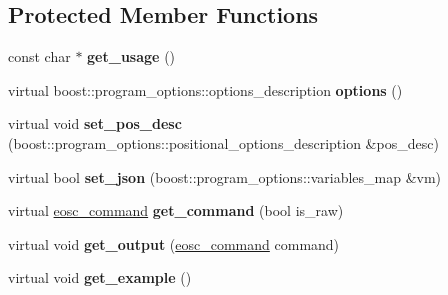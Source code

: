 \subsection*{Protected Member Functions}
\begin{DoxyCompactItemize}
\item 
\mbox{\label{classtokenika_1_1eosc_1_1get__block__options_a4bbbc3a59f550c1b82abe56be743d922}} 
const char $\ast$ {\bfseries get\+\_\+usage} ()
\item 
\mbox{\label{classtokenika_1_1eosc_1_1get__block__options_ad0734aa9d509a4b3465b6bc4e3bbbf69}} 
virtual boost\+::program\+\_\+options\+::options\+\_\+description {\bfseries options} ()
\item 
\mbox{\label{classtokenika_1_1eosc_1_1get__block__options_ac1d672107af6d977f72b3a8c24792859}} 
virtual void {\bfseries set\+\_\+pos\+\_\+desc} (boost\+::program\+\_\+options\+::positional\+\_\+options\+\_\+description \&pos\+\_\+desc)
\item 
\mbox{\label{classtokenika_1_1eosc_1_1get__block__options_a220d34ce4b86ec412d1ac1543cbd1417}} 
virtual bool {\bfseries set\+\_\+json} (boost\+::program\+\_\+options\+::variables\+\_\+map \&vm)
\item 
\mbox{\label{classtokenika_1_1eosc_1_1get__block__options_a1ffc7685f937a5798197d3a22d5e6378}} 
virtual \hyperlink{classtokenika_1_1eosc_1_1eosc__command}{eosc\+\_\+command} {\bfseries get\+\_\+command} (bool is\+\_\+raw)
\item 
\mbox{\label{classtokenika_1_1eosc_1_1get__block__options_a273ea349b38fea0dd35da0c5d774f718}} 
virtual void {\bfseries get\+\_\+output} (\hyperlink{classtokenika_1_1eosc_1_1eosc__command}{eosc\+\_\+command} command)
\item 
\mbox{\label{classtokenika_1_1eosc_1_1get__block__options_a8dcb19e3758d22b7a574617caf5afc82}} 
virtual void {\bfseries get\+\_\+example} ()
\end{DoxyCompactItemize}
